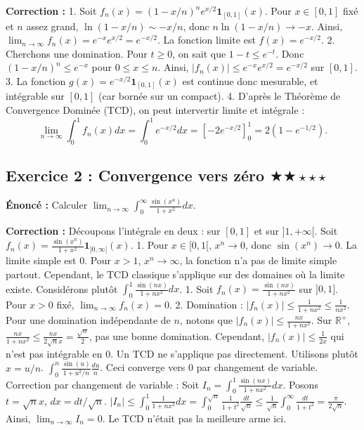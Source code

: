 \documentclass[11pt,a4paper]{article}
\begin{document}
\textbf{Correction :}
1. Soit $f_n(x) = (1 - x/n)^n e^{x/2} \mathbf{1}_{[0, 1]}(x)$. Pour $x \in [0, 1]$ fixé et $n$ assez grand, $\ln(1 - x/n) \sim -x/n$, donc $n \ln(1 - x/n) \to -x$. Ainsi, $\lim_{n \to \infty} f_n(x) = e^{-x} e^{x/2} = e^{-x/2}$. La fonction limite est $f(x) = e^{-x/2}$.
2. Cherchons une domination. Pour $t \ge 0$, on sait que $1 - t \le e^{-t}$. Donc $(1 - x/n)^n \le e^{-x}$ pour $0 \le x \le n$.
Ainsi, $|f_n(x)| \le e^{-x} e^{x/2} = e^{-x/2}$ sur $[0, 1]$.
3. La fonction $g(x) = e^{-x/2} \mathbf{1}_{[0, 1]}(x)$ est continue donc mesurable, et intégrable sur $[0, 1]$ (car bornée sur un compact).
4. D'après le Théorème de Convergence Dominée (TCD), on peut intervertir limite et intégrale :
$$ \lim_{n \to \infty} \int_0^1 f_n(x) dx = \int_0^1 e^{-x/2} dx = \left[ -2 e^{-x/2} \right]_0^1 = 2(1 - e^{-1/2}). $$


\subsection*{Exercice 2 : Convergence vers zéro \quad $\bigstar\bigstar\star\star\star$}

\textbf{Énoncé :}
Calculer $\lim_{n \to \infty} \int_0^\infty \frac{\sin(x^n)}{1 + x^2} dx$.

\textbf{Correction :}
Découpons l'intégrale en deux : sur $[0, 1]$ et sur $]1, +\infty[$.
Soit $f_n(x) = \frac{\sin(x^n)}{1 + x^2} \mathbf{1}_{]0, \infty[}(x)$.
1. Pour $x \in [0, 1[$, $x^n \to 0$, donc $\sin(x^n) \to 0$. La limite simple est 0.
Pour $x > 1$, $x^n \to \infty$, la fonction n'a pas de limite simple partout. Cependant, le TCD classique s'applique sur des domaines où la limite existe. Considérons plutôt $\int_0^1 \frac{\sin(nx)}{1 + nx^2} dx$.
1. Soit $f_n(x) = \frac{\sin(nx)}{1 + nx^2}$ sur $]0, 1]$. Pour $x > 0$ fixé, $\lim_{n \to \infty} f_n(x) = 0$.
2. Domination : $|f_n(x)| \le \frac{1}{1 + nx^2} \le \frac{1}{nx^2}$.
Pour une domination indépendante de $n$, notons que $|f_n(x)| \le \frac{n x}{1 + nx^2}$. Sur $\mathbb{R}^+$, $\frac{nx}{1+nx^2} \le \frac{nx}{2\sqrt{n}x} = \frac{\sqrt{n}}{2}$, pas une bonne domination.
Cependant, $|f_n(x)| \le \frac{1}{2x}$ qui n'est pas intégrable en 0.
Un TCD ne s'applique pas directement. Utilisons plutôt $x = u/n$.
$\int_0^n \frac{\sin(u)}{1 + u^2/n} \frac{du}{n}$. Ceci converge vers 0 par changement de variable.
Correction par changement de variable :
Soit $I_n = \int_0^1 \frac{\sin(nx)}{1 + nx^2} dx$. Posons $t = \sqrt{n} x$, $dx = dt/\sqrt{n}$.
$|I_n| \le \int_0^1 \frac{1}{1 + nx^2} dx = \int_0^{\sqrt{n}} \frac{1}{1 + t^2} \frac{dt}{\sqrt{n}} \le \frac{1}{\sqrt{n}} \int_0^\infty \frac{dt}{1+t^2} = \frac{\pi}{2\sqrt{n}}$.
Ainsi, $\lim_{n \to \infty} I_n = 0$. Le TCD n'était pas la meilleure arme ici.
\end{document}
